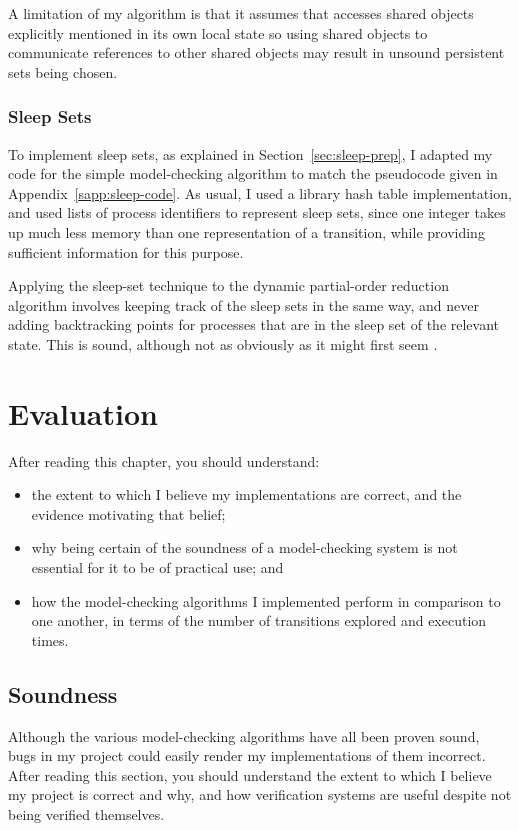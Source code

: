\documentclass[12pt,a4paper,twoside,openright]{report}
\newenvironment{understandinglist}
	{\begin{itemize} \itemsep 0em}{\end{itemize}}
\begin{document}
A limitation of my algorithm is that
it assumes that accesses shared objects
explicitly mentioned in its own
local state so using shared objects
to communicate references to other shared
objects may result in unsound persistent
sets being chosen.

\subsection{Sleep Sets}

To implement sleep sets, as
explained in Section~\ref{sec:sleep-prep},
I adapted my
code for the simple model-checking
algorithm to match the pseudocode
given in Appendix~\ref{sapp:sleep-code}.
As usual, I used a
library hash table implementation,
and used lists of process identifiers
to represent sleep sets, since one
integer takes up much less memory
than one representation of a transition,
while providing sufficient information
for this purpose.

Applying the sleep-set technique to the
dynamic partial-order reduction
algorithm involves keeping track of the
sleep sets in the same way, and never
adding backtracking points for
processes that are in the sleep set
of the relevant state. This is
sound, although not as obviously as
it might first seem \cite{flan05addm}.

\chapter{Evaluation}
\label{cha:evaluation}

After reading this chapter,
you should understand:
\begin{understandinglist}
	\item the extent to which I believe
	my implementations are correct, and the evidence
	motivating that belief;
	\item why being certain of the
	soundness of a model-checking
	system is not essential for it
	to be of practical use; and
	\item how the model-checking
	algorithms I implemented perform
	in comparison to one another,
	in terms of the number of transitions
	explored and execution times.
\end{understandinglist}

\section{Soundness}

Although the various model-checking algorithms
have all been proven sound, bugs in my
project could easily render my implementations
of them incorrect.
After reading this section, you should understand
the extent to which I believe
my project is correct and why, and how
verification systems are useful despite
not being verified themselves.
\end{document}

